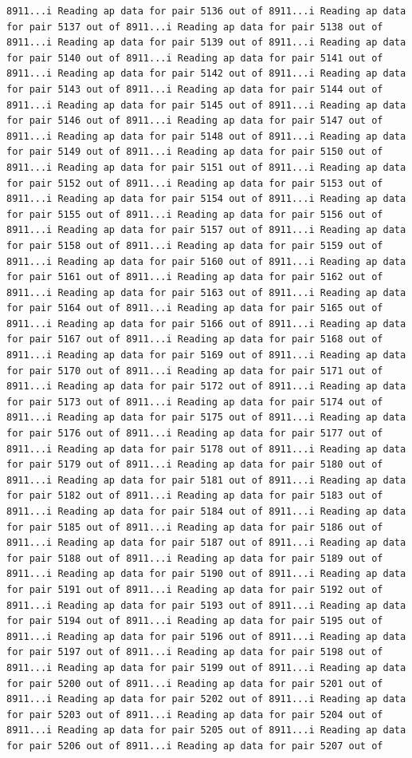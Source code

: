 \documentclass[
]{article}
\begin{document}
\begin{verbatim}
8911...i Reading ap data for pair 5136 out of 8911...i Reading ap data for pair 5137 out of 8911...i Reading ap data for pair 5138 out of 8911...i Reading ap data for pair 5139 out of 8911...i Reading ap data for pair 5140 out of 8911...i Reading ap data for pair 5141 out of 8911...i Reading ap data for pair 5142 out of 8911...i Reading ap data for pair 5143 out of 8911...i Reading ap data for pair 5144 out of 8911...i Reading ap data for pair 5145 out of 8911...i Reading ap data for pair 5146 out of 8911...i Reading ap data for pair 5147 out of 8911...i Reading ap data for pair 5148 out of 8911...i Reading ap data for pair 5149 out of 8911...i Reading ap data for pair 5150 out of 8911...i Reading ap data for pair 5151 out of 8911...i Reading ap data for pair 5152 out of 8911...i Reading ap data for pair 5153 out of 8911...i Reading ap data for pair 5154 out of 8911...i Reading ap data for pair 5155 out of 8911...i Reading ap data for pair 5156 out of 8911...i Reading ap data for pair 5157 out of 8911...i Reading ap data for pair 5158 out of 8911...i Reading ap data for pair 5159 out of 8911...i Reading ap data for pair 5160 out of 8911...i Reading ap data for pair 5161 out of 8911...i Reading ap data for pair 5162 out of 8911...i Reading ap data for pair 5163 out of 8911...i Reading ap data for pair 5164 out of 8911...i Reading ap data for pair 5165 out of 8911...i Reading ap data for pair 5166 out of 8911...i Reading ap data for pair 5167 out of 8911...i Reading ap data for pair 5168 out of 8911...i Reading ap data for pair 5169 out of 8911...i Reading ap data for pair 5170 out of 8911...i Reading ap data for pair 5171 out of 8911...i Reading ap data for pair 5172 out of 8911...i Reading ap data for pair 5173 out of 8911...i Reading ap data for pair 5174 out of 8911...i Reading ap data for pair 5175 out of 8911...i Reading ap data for pair 5176 out of 8911...i Reading ap data for pair 5177 out of 8911...i Reading ap data for pair 5178 out of 8911...i Reading ap data for pair 5179 out of 8911...i Reading ap data for pair 5180 out of 8911...i Reading ap data for pair 5181 out of 8911...i Reading ap data for pair 5182 out of 8911...i Reading ap data for pair 5183 out of 8911...i Reading ap data for pair 5184 out of 8911...i Reading ap data for pair 5185 out of 8911...i Reading ap data for pair 5186 out of 8911...i Reading ap data for pair 5187 out of 8911...i Reading ap data for pair 5188 out of 8911...i Reading ap data for pair 5189 out of 8911...i Reading ap data for pair 5190 out of 8911...i Reading ap data for pair 5191 out of 8911...i Reading ap data for pair 5192 out of 8911...i Reading ap data for pair 5193 out of 8911...i Reading ap data for pair 5194 out of 8911...i Reading ap data for pair 5195 out of 8911...i Reading ap data for pair 5196 out of 8911...i Reading ap data for pair 5197 out of 8911...i Reading ap data for pair 5198 out of 8911...i Reading ap data for pair 5199 out of 8911...i Reading ap data for pair 5200 out of 8911...i Reading ap data for pair 5201 out of 8911...i Reading ap data for pair 5202 out of 8911...i Reading ap data for pair 5203 out of 8911...i Reading ap data for pair 5204 out of 8911...i Reading ap data for pair 5205 out of 8911...i Reading ap data for pair 5206 out of 8911...i Reading ap data for pair 5207 out of 
\end{verbatim}
\end{document}
